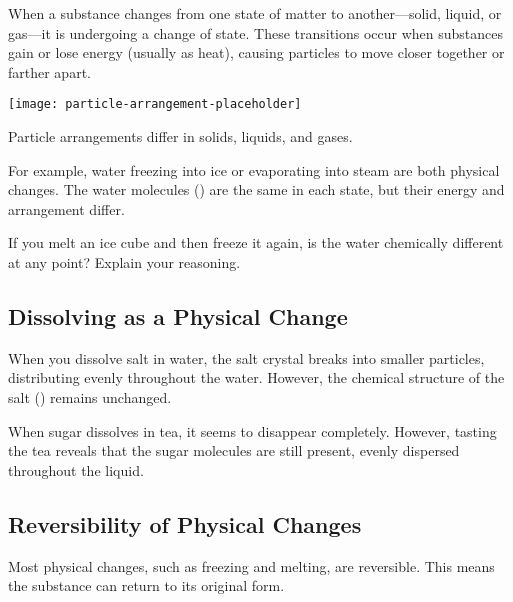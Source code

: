 When a substance changes from one state of matter to another—solid, liquid, or gas—it is undergoing a change of state. These transitions occur when substances gain or lose energy (usually as heat), causing particles to move closer together or farther apart.

\begin{marginfigure}
\centering
\texttt{[image: particle-arrangement-placeholder]}
\caption{Particle arrangements differ in solids, liquids, and gases.}
\label{fig:particles}
\end{marginfigure}

For example, water freezing into ice or evaporating into steam are both physical changes. The water molecules () are the same in each state, but their energy and arrangement differ.

\begin{stopandthink}
If you melt an ice cube and then freeze it again, is the water chemically different at any point? Explain your reasoning.
\end{stopandthink}

\subsection{Dissolving as a Physical Change}

When you dissolve salt in water, the salt crystal breaks into smaller particles, distributing evenly throughout the water. However, the chemical structure of the salt () remains unchanged.

\begin{example}
When sugar dissolves in tea, it seems to disappear completely. However, tasting the tea reveals that the sugar molecules are still present, evenly dispersed throughout the liquid.
\end{example}


\subsection{Reversibility of Physical Changes}

Most physical changes, such as freezing and melting, are reversible. This means the substance can return to its original form.

